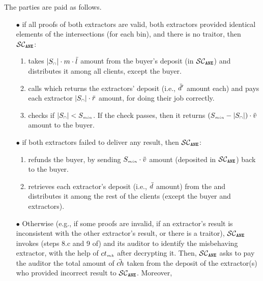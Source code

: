 



\item The parties are paid as follows. 

\begin{itemize}
%
\item[$\bullet$]  if all proofs of both extractors are valid, both extractors provided identical elements of the intersections (for each bin), and there is no traitor, then $\mathcal{SC}_{\mathtt{ANE}}$:
\begin{enumerate}
%
 \item takes $|S_{\scriptscriptstyle\cap}|\cdot m\cdot \ddot{l}$ amount from the buyer's deposit (in $\mathcal{SC}_{\mathtt{ANE}}$) and distributes it among all clients, except the buyer. 
 \item calls \SCpc which returns the extractors' deposit (i.e., $\ddot{d}'$ amount each) and pays each extractor $|S_{\scriptscriptstyle\cap}|\cdot \ddot{r}$ amount, for doing their job correctly. 
 \item checks if $|{ { {S}}}_{\scriptscriptstyle\cap}|<S_{\scriptscriptstyle min}$. If the check passes, then it returns $(S_{\scriptscriptstyle min}-|S_{\scriptscriptstyle\cap}|)\cdot \ddot{v}$ amount  to the buyer.
 \end{enumerate}
% 
\item[$\bullet$] if both extractors failed to deliver any result, then $\mathcal{SC}_{\mathtt{ANE}}$:
%
\begin{enumerate}
%
\item refunds the buyer, by sending $S_{\scriptscriptstyle min}\cdot \ddot{v}$ amount (deposited in $\mathcal{SC}_{\mathtt{ANE}}$) back to the buyer. 
%
\item retrieves each extractor's deposit (i.e., $\ddot{d}$ amount) from the \SCpc and distributes it among the rest of the clients (except the buyer and extractors).  
%
 \end{enumerate}
 \item[$\bullet$]\label{smart-PSI-inconsistency} Otherwise (e.g., if some proofs are invalid, if an extractor's result is inconsistent with the other extractor's result, or there is a traitor), $\mathcal{SC}_{\mathtt{ANE}}$ invokes (steps 8.c and 9 of) \SCpc and its auditor to identify the misbehaving extractor, with the help of $ct_{\scriptscriptstyle mk}$ after decrypting it. Then, $\mathcal{SC}_{\mathtt{ANE}}$ asks \SCpc to pay the auditor the total amount of $\ddot{ch}$ taken from the deposit of the extractor(s) who provided incorrect result to $\mathcal{SC}_{\mathtt{ANE}}$. Moreover,
%


\end{itemize}

